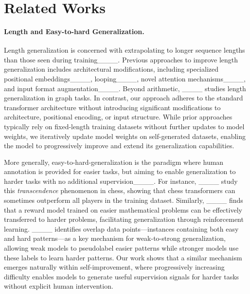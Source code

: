 \section{Related Works}
\label{sec:related_work}

\paragraph{Length and Easy-to-hard Generalization.} 

Length generalization is concerned with extrapolating to longer sequence lengths than those seen during training____. Previous approaches to improve length generalization includes architectural modifications, including specialized positional embeddings____, looping____, novel attention mechanisms____, and input format augmentation____. Beyond arithmetic, ____ studies length generalization in graph tasks. In contrast, our approach adheres to the standard transformer architecture without introducing significant modifications to architecture, positional encoding, or input structure. While prior approaches typically rely on fixed-length training datasets without further updates to model weights, we iteratively update model weights on self-generated datasets, enabling the model to progressively improve and extend its generalization capabilities. 

More generally, easy-to-hard-generalization is the paradigm where human annotation is provided for easier tasks, but aiming to enable generalization to harder tasks with no additional supervision____. 
For instance, ____ study this \textit{transcendence} phenomenon in chess, showing that chess transformers can sometimes outperform all players in the training dataset. Similarly, ____ finds that a reward model trained on easier mathematical problems can be effectively transferred to harder problems, facilitating generalization through reinforcement learning. ____ identifies overlap data points—instances containing both easy and hard patterns—as a key mechanism for weak-to-strong generalization, allowing weak models to pseudolabel easier patterns while stronger models use these labels to learn harder patterns. Our work shows that a similar mechanism emerges naturally within self-improvement, where progressively increasing difficulty enables models to generate useful supervision signals for harder tasks without explicit human intervention.














